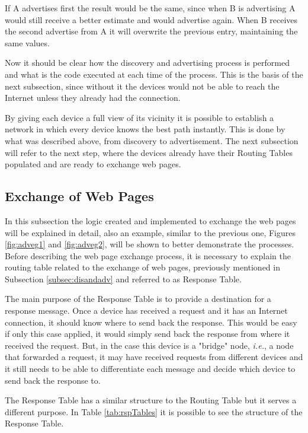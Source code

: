 If A advertises first the result would be the same, since when B is advertising A would still receive a better estimate and would advertise again. When B receives the second advertise from A it will overwrite the previous entry, maintaining the same values.

Now it should be clear how the discovery and advertising process is performed and what is the code executed at each time of the process. This is the basis of the next subsection, since without it the devices would not be able to reach the Internet unless they already had the connection.

By giving each device a full view of its vicinity it is possible to establish a network in which every device knows the best path instantly. This is done by what was described above, from discovery to advertisement. The next subsection will refer to the next step, where the devices already have their Routing Tables populated and are ready to exchange web pages. 

\subsection{Exchange of Web Pages}
\label{subsec:exch}

In this subsection the logic created and implemented to exchange the web pages will be explained in detail, also an example, similar to the previous one, Figures \ref{fig:adveg1} and \ref{fig:adveg2}, will be shown to better demonstrate the processes. Before describing the web page exchange process, it is necessary to explain the routing table related to the exchange of web pages, previously mentioned in Subsection \ref{subsec:disandadv} and referred to as Response Table.

The main purpose of the Response Table is to provide a destination for a response message. Once a device has received a request and it has an Internet connection, it should know where to send back the response. This would be easy if only this case applied, it would simply send back the response from where it received the request. But, in the case this device is a "bridge" node, \textit{i.e.}, a node that forwarded a request, it may have received requests from different devices and it still needs to be able to differentiate each message and decide which device to send back the response to.

The Response Table has a similar structure to the Routing Table but it serves a different purpose. In Table \ref{tab:rspTables} it is possible to see the structure of the Response Table.

